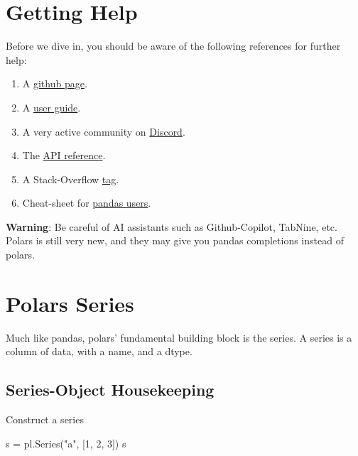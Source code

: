 \documentclass[
  letterpaper,
  DIV=11,
  numbers=noendperiod]{scrartcl}
\newenvironment{Shaded}{\begin{snugshade}}{\end{snugshade}}
\newcommand{\DecValTok}[1]{\textcolor[rgb]{0.68,0.00,0.00}{#1}}
\newcommand{\NormalTok}[1]{\textcolor[rgb]{0.00,0.23,0.31}{#1}}
\newcommand{\OperatorTok}[1]{\textcolor[rgb]{0.37,0.37,0.37}{#1}}
\newcommand{\StringTok}[1]{\textcolor[rgb]{0.13,0.47,0.30}{#1}}
\providecommand{\tightlist}{%
  \setlength{\itemsep}{0pt}\setlength{\parskip}{0pt}}\usepackage{longtable,booktabs,array}
\begin{document}
\hypertarget{getting-help}{%
\section{Getting Help}\label{getting-help}}

Before we dive in, you should be aware of the following references for
further help:

\begin{enumerate}
\def\labelenumi{\arabic{enumi}.}
\tightlist
\item
  A \href{https://github.com/pola-rs/polars}{github page}.
\item
  A
  \href{https://pola-rs.github.io/polars-book/user-guide/index.html}{user
  guide}.
\item
  A very active community on
  \href{https://discord.gg/4UfP5cfBE7}{Discord}.
\item
  The
  \href{https://pola-rs.github.io/polars/py-polars/html/reference/index.html}{API
  reference}.
\item
  A Stack-Overflow
  \href{https://stackoverflow.com/questions/tagged/python-polars}{tag}.
\item
  Cheat-sheet for
  \href{https://www.rhosignal.com/posts/polars-pandas-cheatsheet/}{pandas
  users}.
\end{enumerate}

\textbf{Warning}: Be careful of AI assistants such as Github-Copilot,
TabNine, etc. Polars is still very new, and they may give you pandas
completions instead of polars.

\hypertarget{polars-series}{%
\section{Polars Series}\label{polars-series}}

Much like pandas, polars' fundamental building block is the series. A
series is a column of data, with a name, and a dtype.

\hypertarget{series-object-housekeeping}{%
\subsection{Series-Object
Housekeeping}\label{series-object-housekeeping}}

Construct a series

\begin{Shaded}
\begin{Highlighting}[]
\NormalTok{s }\OperatorTok{=}\NormalTok{ pl.Series(}\StringTok{"a"}\NormalTok{, [}\DecValTok{1}\NormalTok{, }\DecValTok{2}\NormalTok{, }\DecValTok{3}\NormalTok{])}
\NormalTok{s}
\end{Highlighting}
\end{Shaded}
\end{document}

